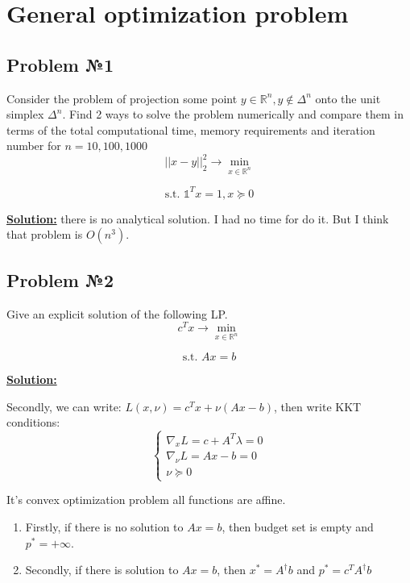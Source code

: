 \section{General optimization problem}
\subsection{Problem №1}
Consider the problem of projection some point $y \in \mathds{R}^n, y \not \in \Delta^n$ onto the unit simplex $\Delta^n$. Find 2 ways to solve the problem numerically and compare them in terms of the total computational time, memory requirements and iteration number for $n = 10, 100, 1000$
\begin{equation*}
    ||x-y||_2^2  \xrightarrow{} \min\limits_{x \in \mathds{R}^n}
\end{equation*}

\begin{equation*}
   \text{s.t. } \mathds{1}^Tx = 1, x \succeq 0
\end{equation*}

\underline{\textbf{Solution:}} there is no analytical solution. I had no time for do it. But I think that problem is $O(n^3)$.

\subsection{Problem №2}
Give an explicit solution of the following LP.
\begin{equation*}
    c^T x  \xrightarrow{} \min\limits_{x \in \mathds{R}^n}
\end{equation*}

\begin{equation*}
   \text{s.t. } Ax = b
\end{equation*}

\underline{\textbf{Solution:}}

Secondly, we can write: $L(x, \nu) = c^Tx + \nu(Ax-b)$, then write KKT conditions:
\begin{equation*}
    \begin{cases}
    \nabla_x L = c + A^T\lambda = 0 \\
    \nabla_{\nu} L = Ax - b =0   \\
    \nu \succeq 0 
    \end{cases}
\end{equation*}


It's convex optimization problem all functions are affine. 

\begin{enumerate}
    \item Firstly, if there is no solution to $Ax = b$, then budget set is empty and $p^* = +\infty$.
    \item Secondly, if there is solution to $Ax = b$, then $x^* = A^{\dag}b$ and $p^* = c^TA^{\dag}b$
\end{enumerate}

